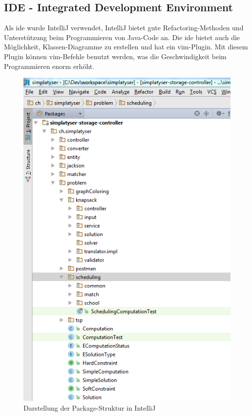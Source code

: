 \subsection{IDE - Integrated Development Environment}
Als \gls{ide} wurde IntelliJ \cite{intellij} verwendet, IntelliJ bietet gute Refactoring-Methoden und Unterstützung beim Programmieren von Java-Code an. Die \gls{ide} 
bietet auch die Möglichkeit, Klassen-Diagramme zu erstellen und hat ein \gls{vim}-Plugin. Mit diesem Plugin können \gls{vim}-Befehle benutzt werden, was die 
Geschwindigkeit beim Programmieren enorm erhöht.

\begin{figure}[h]
\centering
\includegraphics[scale=0.7]{images/IntelliJ.png}
\caption[Darstellung der Package-Struktur in IntelliJ]{Darstellung der Package-Struktur in IntelliJ \selfmade{}}
\label{fig:IntelliJ}
\end{figure}

